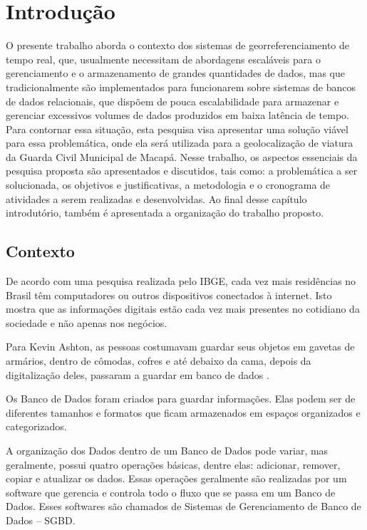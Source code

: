 %
%

\chapter{Introdução}\label{chap:introducao}  

O presente trabalho aborda o contexto dos sistemas de georreferenciamento de tempo real, que, usualmente necessitam de abordagens escaláveis para o gerenciamento e o armazenamento de grandes quantidades de dados, mas que tradicionalmente são implementados para funcionarem sobre sistemas de bancos de dados relacionais, que dispõem de pouca escalabilidade para armazenar e gerenciar excessivos volumes de dados produzidos em baixa latência de tempo. Para contornar essa situação, esta pesquisa visa apresentar uma solução viável para essa problemática, onde ela será utilizada para a geolocalização de viatura da Guarda Civil Municipal de Macapá. Nesse trabalho, os aspectos essenciais da pesquisa proposta são apresentados e discutidos, tais como: a problemática a ser solucionada, os objetivos e justificativas, a metodologia e o cronograma de atividades a serem realizadas e desenvolvidas. Ao final desse capítulo introdutório, também é apresentada a organização do trabalho proposto.

\section {Contexto}

De acordo com uma pesquisa realizada pelo IBGE, cada vez mais residências no Brasil têm computadores ou outros dispositivos conectados à internet\cite{IBGE-2018}. Isto mostra que as informações digitais estão cada vez mais presentes no cotidiano da sociedade e não apenas nos negócios.

Para Kevin Ashton, as pessoas costumavam guardar seus objetos em gavetas de armários, dentro de cômodas, cofres e até debaixo da cama, depois da digitalização deles, passaram a guardar em banco de dados \cite{Ashton-2016}.

Os Banco de Dados foram criados para guardar informações. Elas podem ser de diferentes tamanhos e formatos que ficam armazenados em espaços organizados e categorizados\cite{Kotaro-2005}.

A organização dos Dados dentro de um Banco de Dados pode variar, mas geralmente, possui quatro operações básicas, dentre elas: adicionar, remover, copiar e atualizar os dados. Essas operações geralmente são realizadas por um software que gerencia e controla todo o fluxo que se passa em um Banco de Dados. Esses softwares são chamados de Sistemas de Gerenciamento de Banco de Dados -- SGBD\cite{C.Date}.

